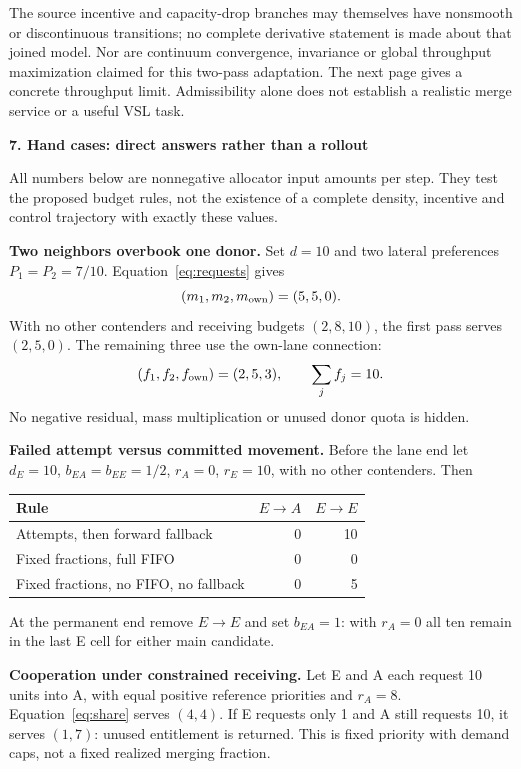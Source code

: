 \documentclass[10pt,a4paper]{article}
\newcommand{\head}[1]{\par\medskip\textbf{#1}\par}
\begin{document}
The source incentive and capacity-drop branches may themselves have
nonsmooth or discontinuous transitions; no complete derivative statement is
made about that joined model. Nor are continuum convergence, invariance or
global throughput maximization claimed for this two-pass adaptation. The
next page gives a concrete throughput limit. Admissibility alone does not
establish a realistic merge service or a useful VSL task.

\newpage
\head{7. Hand cases: direct answers rather than a rollout}
All numbers below are nonnegative allocator input amounts per step. They
test the proposed budget rules, not the existence of a complete density,
incentive and control trajectory with exactly these values.

\textbf{Two neighbors overbook one donor.} Set $d=10$ and two lateral
preferences $P_1=P_2=7/10$. Equation~\eqref{eq:requests} gives
\begin{equation}
 (m_1,m_2,m_{\rm own})=(5,5,0).
\end{equation}
With no other contenders and receiving budgets $(2,8,10)$, the first pass
serves $(2,5,0)$. The remaining three use the own-lane connection:
\begin{equation}
 (f_1,f_2,f_{\rm own})=(2,5,3),\qquad \sum_jf_j=10.
\end{equation}
No negative residual, mass multiplication or unused donor quota is hidden.

\textbf{Failed attempt versus committed movement.} Before the lane end let
$d_E=10$, $b_{EA}=b_{EE}=1/2$, $r_A=0$, $r_E=10$, with no other contenders.
Then
\begin{center}
\begin{tabular}{lrr}
\toprule
Rule & $E\to A$ & $E\to E$\\
\midrule
Attempts, then forward fallback & 0 & 10\\
Fixed fractions, full FIFO & 0 & 0\\
Fixed fractions, no FIFO, no fallback & 0 & 5\\
\bottomrule
\end{tabular}
\end{center}
At the permanent end remove $E\to E$ and set $b_{EA}=1$: with $r_A=0$
all ten remain in the last E cell for either main candidate.

\textbf{Cooperation under constrained receiving.} Let E and A each request
10 units into A, with equal positive reference priorities and $r_A=8$.
Equation~\eqref{eq:share} serves $(4,4)$. If E requests only 1 and A still
requests 10, it serves $(1,7)$: unused entitlement is returned. This is fixed
priority with demand caps, not a fixed realized merging fraction.
\end{document}
